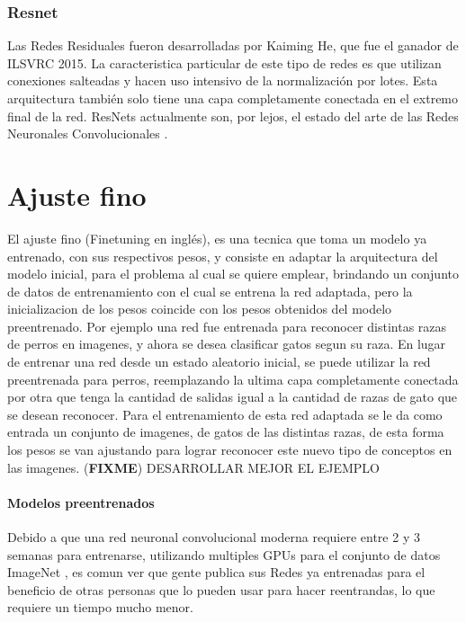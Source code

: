 \documentclass[a4paper,11pt,spanish]{book}
\newcommand*{\FIXME}[1]{{(\textbf{FIXME}) {#1}}}
\begin{document}
      \subsubsection{Resnet}
	Las Redes Residuales fueron desarrolladas por Kaiming He, que fue el ganador de ILSVRC 2015. La caracteristica particular de este tipo de redes es que  utilizan conexiones salteadas
	y hacen uso intensivo de la normalización por lotes.
	Esta arquitectura también solo tiene una capa completamente conectada en el extremo final de la red. ResNets actualmente son, por lejos, el estado del arte de las
	Redes Neuronales Convolucionales \cite{Kaiming:ResNet} .

    \section {Ajuste fino}
      El ajuste fino (Finetuning en inglés), es una tecnica que toma un modelo ya entrenado, con sus respectivos pesos,  y consiste en adaptar la arquitectura
      del modelo inicial, para el problema al cual se quiere emplear, brindando un conjunto de datos de entrenamiento con el cual se entrena la red adaptada,
      pero la inicializacion de los pesos coincide con los pesos obtenidos del modelo preentrenado.
      Por ejemplo una red fue entrenada para reconocer distintas razas de perros en imagenes, y ahora se desea clasificar gatos segun su raza. En lugar de entrenar una
      red desde un estado aleatorio inicial, se puede utilizar la red preentrenada para perros, reemplazando la ultima capa completamente conectada por otra que
      tenga la cantidad de salidas igual a la cantidad de razas de gato que se desean reconocer.
      Para el entrenamiento de esta red adaptada se le da como entrada un conjunto de imagenes, de gatos de las distintas razas, de esta forma los  pesos se van
      ajustando para lograr reconocer este nuevo tipo de conceptos en las imagenes.
      \FIXME{DESARROLLAR MEJOR EL EJEMPLO}
      \paragraph{Modelos preentrenados}
	Debido a que una red neuronal convolucional moderna requiere entre 2 y 3 semanas para entrenarse, utilizando multiples GPUs para el conjunto de datos ImageNet \cite{imagenet_cvpr09},
	es comun ver que gente publica sus Redes ya entrenadas para el beneficio de otras personas que lo pueden usar para hacer reentrandas, lo que requiere un tiempo mucho menor.
\end{document}
